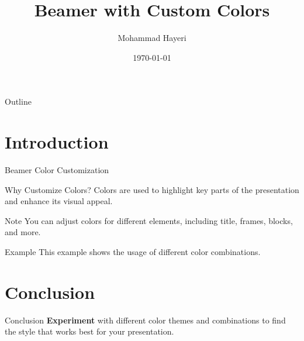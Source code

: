 \documentclass{beamer}
\title[Custom Theme Color]{Beamer with Custom Colors}
\author{Mohammad Hayeri}
\institute{Your Institute}
\date{\today}
\begin{document}
	
	\begin{frame}
		\titlepage
	\end{frame}
	
	\begin{frame}{Outline}
		\tableofcontents
	\end{frame}
	
	\section{Introduction}
	\begin{frame}{Beamer Color Customization}
		\begin{block}{Why Customize Colors?}
			Colors are used to highlight key parts of the presentation and enhance its visual appeal.
		\end{block}
		
		\begin{alertblock}{Note}
			You can adjust colors for different elements, including title, frames, blocks, and more.
		\end{alertblock}
		
		\begin{exampleblock}{Example}
			This example shows the usage of different color combinations.
		\end{exampleblock}
	\end{frame}
	
	\section{Conclusion}
	\begin{frame}{Conclusion}
		\textbf{Experiment} with different color themes and combinations to find the style that works best for your presentation.
	\end{frame}
	
\end{document}
